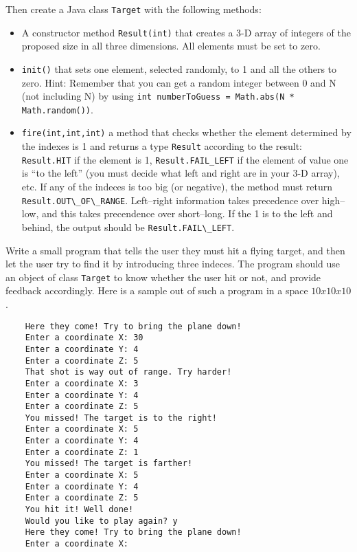 \documentclass{article}
\begin{document}
Then create a Java class \verb+Target+ with the following methods: 

\begin{itemize}
\item A constructor method \verb+Result(int)+ that creates a 3-D array 
  of integers of the
  proposed size in all three dimensions. All elements must be set to
  zero.
\item \verb+init()+ that sets one element, selected randomly, to 1 and
  all the others to zero. Hint: Remember that you can get a random
  integer between 0 and N (not including N) by
  using \verb+int numberToGuess = Math.abs(N * Math.random())+.
\item \verb+fire(int,int,int)+ a method that checks whether the
  element determined by the indexes is 1 and returns a type
  \verb+Result+ according to the result: \verb+Result.HIT+ if the
  element is 1, \verb+Result.FAIL_LEFT+ if the element of value one is
  ``to the left'' (you must decide what left and right are in your 3-D
  array), etc. If any of the indeces is too big (or negative), the
  method must return \verb+Result.OUT\_OF\_RANGE+. Left--right
  information takes precedence over high--low, and this takes
  precendence over short--long. If the 1 is to the left and behind,
  the output should be \verb+Result.FAIL\_LEFT+.
\end{itemize}

Write a small program that tells the user they must hit a flying
target, and then let the user try to find it by introducing three
indeces. The program should use an object of class \verb+Target+ to
know whether the user hit or not, and provide feedback
accordingly. Here is a sample out of such a program in a space $10 x
10 x 10$. 

\begin{verbatim}
    Here they come! Try to bring the plane down!
    Enter a coordinate X: 30
    Enter a coordinate Y: 4
    Enter a coordinate Z: 5
    That shot is way out of range. Try harder!
    Enter a coordinate X: 3
    Enter a coordinate Y: 4
    Enter a coordinate Z: 5
    You missed! The target is to the right!
    Enter a coordinate X: 5
    Enter a coordinate Y: 4
    Enter a coordinate Z: 1
    You missed! The target is farther!
    Enter a coordinate X: 5
    Enter a coordinate Y: 4
    Enter a coordinate Z: 5
    You hit it! Well done!
    Would you like to play again? y
    Here they come! Try to bring the plane down!
    Enter a coordinate X: 
\end{verbatim}
\end{document}
